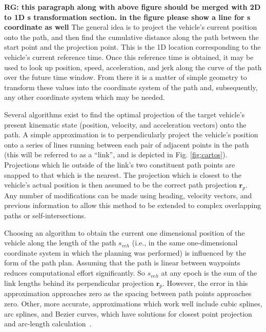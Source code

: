 \documentclass[letterpaper, 10 pt, conference]{ieeeconf}  %
\begin{document}
\textbf{RG: this paragraph along with above figure should be merged with 2D to 1D s transformation section. in the figure please show a line for s coordinate as well} The general idea is to project the vehicle's current position onto the path, and then find the cumulative distance along the path between the start point and the projection point.
This is the 1D location corresponding to the vehicle's current reference time.
Once this reference time is obtained, it may be used to look up position, speed, acceleration, and jerk along the curve of the path over the future time window.
From there it is a matter of simple geometry to transform these values into the coordinate system of the path and, subsequently, any other coordinate system which may be needed.


Several algorithms exist to find the optimal projection of the target vehicle's present kinematic state (position, velocity, and acceleration vectors) onto the path.
A simple approximation is to perpendicularly project the vehicle's position onto a series of lines running between each pair of adjacent points in the path (this will be referred to as a ``link'', and is depicted in Fig. \ref{fig:cartos}).
Projections which lie outside of the link's two constituent path points are snapped to that which is the nearest.
The projection which is closest to the vehicle's actual position is then assumed to be the correct path projection $\mathbf{r}_p$.
Any number of modifications can be made using heading, velocity vectors, and previous information to allow this method to be extended to complex overlapping paths or self-intersections.

Choosing an algorithm to obtain the current one dimensional position of the vehicle along the length of the path $s_{veh}$ (i.e., in the same one-dimensional coordinate system in which the planning was performed) is influenced by the form of the path plan.
Assuming that the path is linear between waypoints reduces computational effort significantly.
So $s_{veh}$ at any epoch is the sum of the link lengths behind its perpendicular projection $\mathbf{r}_p$.
However, the error in this approximation approaches zero as the spacing between path points approaches zero.
Other, more accurate, approximations which work well include cubic splines, arc splines, and Bezier curves, which have solutions for closest point projection and arc-length calculation~\cite{Wang2002,Wang2003,Schindler2011}.
\end{document}
